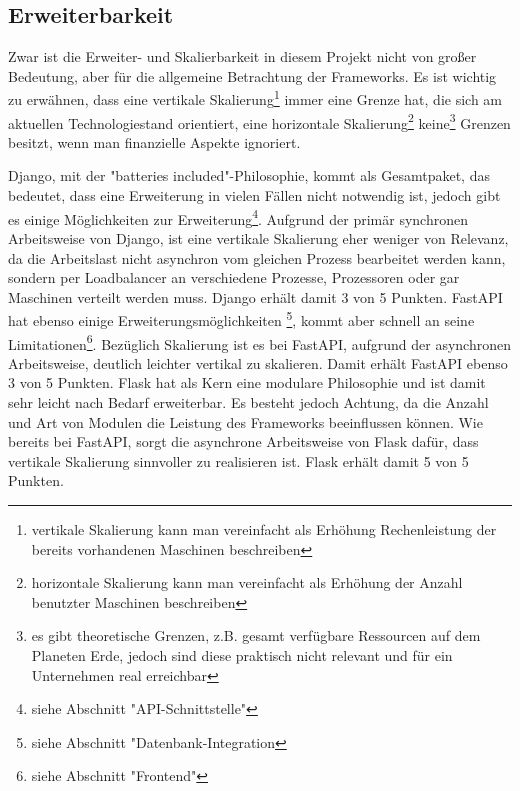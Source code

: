 \documentclass[letterpaper,11pt,leqno]{article}
\begin{document}
\subsection{Erweiterbarkeit}
Zwar ist die Erweiter- und Skalierbarkeit in diesem Projekt nicht von großer Bedeutung, aber für die allgemeine Betrachtung der
Frameworks. Es ist wichtig zu erwähnen, dass eine vertikale Skalierung\footnote{vertikale Skalierung kann man vereinfacht als
Erhöhung Rechenleistung der bereits vorhandenen Maschinen beschreiben} immer eine Grenze hat, die sich am aktuellen Technologiestand
orientiert, eine horizontale Skalierung\footnote{horizontale Skalierung kann man vereinfacht als Erhöhung der Anzahl benutzter
Maschinen beschreiben} keine\footnote{es gibt theoretische Grenzen, z.B. gesamt verfügbare Ressourcen auf dem Planeten Erde, jedoch
sind diese praktisch nicht relevant und für ein Unternehmen real erreichbar} Grenzen besitzt, wenn man finanzielle Aspekte
ignoriert.

Django, mit der "batteries included"-Philosophie, kommt als Gesamtpaket, das bedeutet, dass eine Erweiterung in vielen Fällen nicht
notwendig ist, jedoch gibt es einige Möglichkeiten zur Erweiterung\footnote{siehe Abschnitt "API-Schnittstelle"}. Aufgrund der
primär synchronen Arbeitsweise von Django, ist eine vertikale Skalierung eher weniger von Relevanz, da die Arbeitslast nicht
asynchron vom gleichen Prozess bearbeitet werden kann, sondern per Loadbalancer an verschiedene Prozesse, Prozessoren oder gar
Maschinen verteilt werden muss. Django erhält damit 3 von 5 Punkten. FastAPI hat ebenso einige Erweiterungsmöglichkeiten
\footnote{siehe Abschnitt "Datenbank-Integration}, kommt aber schnell an seine Limitationen\footnote{siehe Abschnitt "Frontend"}.
Bezüglich Skalierung ist es bei FastAPI, aufgrund der asynchronen Arbeitsweise, deutlich leichter vertikal zu skalieren. Damit
erhält FastAPI ebenso 3 von 5 Punkten. Flask hat als Kern eine modulare Philosophie und ist damit sehr leicht nach Bedarf
erweiterbar. Es besteht jedoch Achtung, da die Anzahl und Art von Modulen die Leistung des Frameworks beeinflussen können. Wie
bereits bei FastAPI, sorgt die asynchrone Arbeitsweise von Flask dafür, dass vertikale Skalierung sinnvoller zu realisieren ist.
Flask erhält damit 5 von 5 Punkten.
\end{document}
